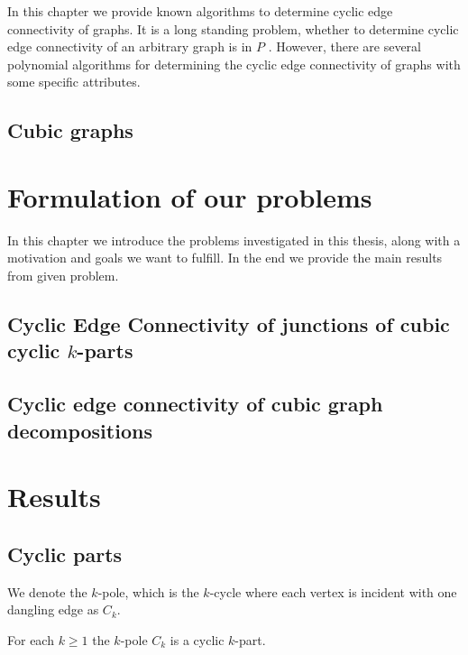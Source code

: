\documentclass[12pt, twoside]{book}
\begin{document}
In this chapter we provide known algorithms to determine cyclic edge connectivity of graphs. It is a long standing problem, whether to determine cyclic edge connectivity of an arbitrary graph is in $P$ . However, there are several polynomial algorithms for determining the cyclic edge connectivity of graphs with some specific attributes.

\section{Cubic graphs}\label{sec:cubic-graphs}


\chapter{Formulation of our problems}\label{ch:problem-formulation}

In this chapter we introduce the problems investigated in this thesis, along with a motivation and goals we want to fulfill. In the end we provide the main results from given problem.

\section{Cyclic Edge Connectivity of junctions of cubic cyclic $k$-parts}

\section{Cyclic edge connectivity of cubic graph decompositions}


\chapter{Results}\label{ch:results}

\section{Cyclic parts}\label{sec:cyclic-part-results}

We denote the $k$-pole, which is the $k$-cycle where each vertex is incident with one dangling edge as $C_k$.

\begin{lemma}\label{lem:each-cycle-cyclic-part}
	For each $k\geq 1$ the $k$-pole $C_k$ is a cyclic $k$-part. 
\end{lemma}
\end{document}
